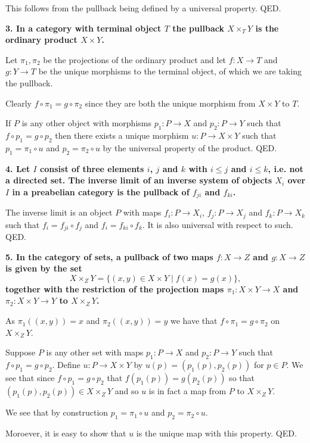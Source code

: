 \documentclass[12pt]{article}
\begin{document}
This follows from the pullback being defined by a universal property. QED.

\textbf{3. In a category with terminal object $T$ the pullback $X\times_T Y$ is the ordinary product $X\times Y$.}

Let $\pi_1, \pi_2$ be the projections of the ordinary product and let $f : X \to T$ and $g : Y\to T$ be the unique morphisms to the terminal object, of which we are taking the pullback.

Clearly $f\circ \pi_1 = g\circ \pi_2$ since they are both the unique morphism from $X\times Y$ to $T$.

If $P$ is any other object with morphisms $p_1 : P \to X$ and $p_2 : P \to Y$ such that $f\circ p_1 = g\circ p_2$ then there exists a unique morphism $u : P \to X\times Y$ such that $p_1 = \pi_1\circ u$ and $p_2 = \pi_2\circ u$ by the universal property of the product. QED.

\textbf{4. Let $I$ consist of three elements $i$, $j$ and $k$ with $i \leq j$ and $i \leq k$, i.e. not a directed set. The inverse limit of an inverse system of objects $X_i$ over $I$ in a preabelian category is the pullback of $f_{ji}$ and $f_{ki}$.}

The inverse limit is an object $P$ with maps $f_i : P \to X_i$, $f_j : P \to X_j$ and $f_k : P \to X_k$ such that $f_i = f_{ji}\circ f_j$ and $f_i = f_{ki}\circ f_k$. It is also universal with respect to such. QED.

\textbf{5. In the category of sets, a pullback of two maps $f : X \to Z$ and $g : X \to Z$ is given by the set
$$X\times_Z Y = \{(x, y) \in X\times Y \;|\; f(x) = g(x)\},$$
together with the restriction of the projection maps $\pi_1 : X\times Y \to X$ and $\pi_2 : X\times Y \to Y$ to $X\times_Z Y$.}

As $\pi_1((x, y)) = x$ and $\pi_2((x, y)) = y$ we have that $f\circ \pi_1 = g\circ \pi_2$ on $X\times_Z Y$.

Suppose $P$ is any other set with maps $p_1 : P \to X$ and $p_2 : P \to Y$ such that $f\circ p_1 = g\circ p_2$. Define $u : P \to X\times Y$ by $u(p) = (p_1(p), p_2(p))$ for $p \in P$. We see that since $f\circ p_1 = g\circ p_2$ that $f(p_1(p)) = g(p_2(p))$ so that $(p_1(p), p_2(p)) \in X\times_Z Y$ and so $u$ is in fact a map from $P$ to $X\times_Z Y$.

We see that by construction $p_1 = \pi_1\circ u$ and $p_2 = \pi_2\circ u$.

Moroever, it is easy to show that $u$ is the unique map with this property. QED.
\end{document}
